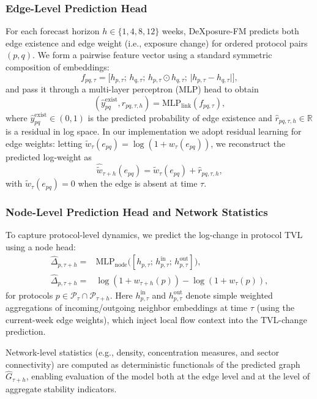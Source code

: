 \subsubsection{Edge-Level Prediction Head}

For each forecast horizon $h\in\{1, 4, 8, 12\}$ weeks, DeXposure-FM predicts both edge existence and edge weight (i.e., exposure change) for ordered protocol pairs $(p,q)$. We form a pairwise feature vector using a standard symmetric composition of embeddings:
\begin{equation}
 f_{pq,\tau}=\Big[ h_{p,\tau};\,  h_{q,\tau};\,  h_{p,\tau}\odot   h_{q,\tau};\,\lvert  h_{p,\tau}-  h_{q,\tau}\rvert\Big],
\end{equation}
and pass it through a multi-layer perceptron (MLP) head to obtain
\begin{equation}
(\widehat{y}^{\mathrm{exist}}_{pq}, \widehat{r}_{pq,\tau,h}) = \mathrm{MLP}_{\mathrm{link}}({f}_{pq,\tau}),
\end{equation}
where $\widehat{y}^{\mathrm{exist}}_{pq}\in(0,1)$ is the predicted probability of edge existence and $\widehat{r}_{pq,\tau,h}\in\mathbb{R}$ is a residual in log space. In our implementation we adopt residual learning for edge weights: letting $\tilde{w}_{\tau}(e_{pq})=\log(1+w_{\tau}(e_{pq}))$, we reconstruct the predicted log-weight as
\begin{equation}
\widehat{\tilde{w}}_{\tau+h}(e_{pq})=\tilde{w}_{\tau}(e_{pq})+\widehat{r}_{pq,\tau,h},
\end{equation}
with $\tilde{w}_{\tau}(e_{pq})=0$ when the edge is absent at time $\tau$.
\subsubsection{Node-Level Prediction Head and Network Statistics}

To capture protocol-level dynamics, we predict the log-change in protocol TVL using a node head:
\begin{align*}
    \widehat{\Delta}_{p,\tau+h} = &\mathrm{MLP}_{\mathrm{node}}\!\Big([h_{p,\tau};\,h^{\mathrm{in}}_{p,\tau};\,h^{\mathrm{out}}_{p,\tau}]\Big),\\
\widehat{\Delta}_{p,\tau+h} =& \log(1+w_{\tau+h}(p)) - \log(1+w_{\tau}(p)),
\end{align*}
for protocols $p\in\mathcal{P}_{\tau}\cap\mathcal{P}_{\tau+h}$.
Here $h^{\mathrm{in}}_{p,\tau}$ and $h^{\mathrm{out}}_{p,\tau}$ denote simple weighted aggregations of incoming/outgoing neighbor embeddings at time $\tau$ (using the current-week edge weights), which inject local flow context into the TVL-change prediction.


Network-level statistics (e.g., density, concentration measures, and sector connectivity) are computed as deterministic functionals of the predicted graph $\widehat{G}_{\tau+h}$, enabling evaluation of the model both at the edge level and at the level of aggregate stability indicators.

